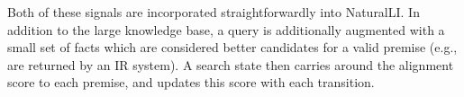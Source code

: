 Both of these signals are incorporated straightforwardly into NaturalLI.
In addition to the large knowledge base, a query is additionally augmented
  with a small set of facts which are considered better candidates for
  a valid premise (e.g., are returned by an IR system).
A search state then carries around the alignment score to each premise,
  and updates this score with each transition.
